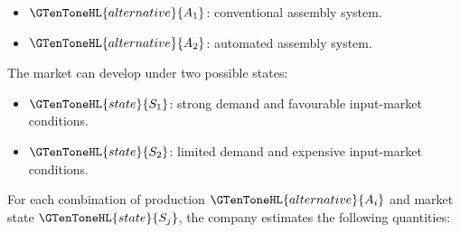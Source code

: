 \begin{itemize}
	\item $\GTenToneHL{alternative}{A_1}$: conventional assembly system.
	\item $\GTenToneHL{alternative}{A_2}$: automated assembly system.
\end{itemize}

The market can develop under two possible states:

\begin{itemize}
	\item $\GTenToneHL{state}{S_1}$: strong demand and favourable input-market conditions.
	\item $\GTenToneHL{state}{S_2}$: limited demand and expensive input-market conditions.
\end{itemize}

For each combination of production  $\GTenToneHL{alternative}{A_i}$ and market state $\GTenToneHL{state}{S_j}$,
the company estimates the following quantities:


